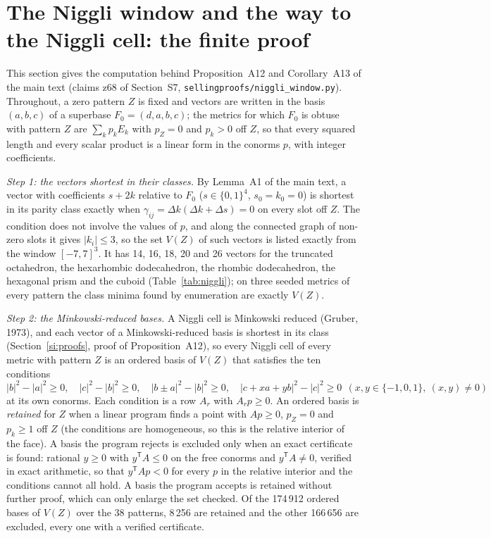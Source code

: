 \documentclass[preprint,pdf]{iucr}          %
\begin{document}
\section{The Niggli window and the way to the Niggli cell: the finite proof}\label{si:niggli}

This section gives the computation behind Proposition~A12 and Corollary~A13 of the main text (claims z68 of Section~S7, \texttt{sellingproofs/niggli\_window.py}). Throughout, a zero pattern $Z$ is fixed and vectors are written in the basis $(a,b,c)$ of a superbase $F_0=(d,a,b,c)$; the metrics for which $F_0$ is obtuse with pattern $Z$ are $\sum_kp_kE_k$ with $p_Z=0$ and $p_k>0$ off $Z$, so that every squared length and every scalar product is a linear form in the conorms $p$, with integer coefficients.

\emph{Step 1: the vectors shortest in their classes.} By Lemma~A1 of the main text, a vector with coefficients $s+2k$ relative to $F_0$ ($s\in\{0,1\}^4$, $s_0=k_0=0$) is shortest in its parity class exactly when $\gamma_{ij}=\Delta k(\Delta k+\Delta s)=0$ on every slot off $Z$. The condition does not involve the values of $p$, and along the connected graph of non-zero slots it gives $|k_i|\le3$, so the set $V(Z)$ of such vectors is listed exactly from the window $[-7,7]^3$. It has 14, 16, 18, 20 and 26 vectors for the truncated octahedron, the hexarhombic dodecahedron, the rhombic dodecahedron, the hexagonal prism and the cuboid (Table~\ref{tab:niggli}); on three seeded metrics of every pattern the class minima found by enumeration are exactly $V(Z)$.

\emph{Step 2: the Minkowski-reduced bases.} A Niggli cell is Minkowski reduced (Gruber, 1973), and each vector of a Minkowski-reduced basis is shortest in its class (Section~\ref{si:proofs}, proof of Proposition~A12), so every Niggli cell of every metric with pattern $Z$ is an ordered basis of $V(Z)$ that satisfies the ten conditions
\[
|b|^2-|a|^2\ge0,\quad |c|^2-|b|^2\ge0,\quad |b\pm a|^2-|b|^2\ge0,\quad |c+xa+yb|^2-|c|^2\ge0\ \ (x,y\in\{-1,0,1\},\ (x,y)\ne0)
\]
at its own conorms. Each condition is a row $A_r$ with $A_rp\ge0$. An ordered basis is \emph{retained} for $Z$ when a linear program finds a point with $A p\ge0$, $p_Z=0$ and $p_k\ge1$ off $Z$ (the conditions are homogeneous, so this is the relative interior of the face). A basis the program rejects is excluded only when an exact certificate is found: rational $y\ge0$ with $y^{\mathsf T}A\le0$ on the free conorms and $y^{\mathsf T}A\ne0$, verified in exact arithmetic, so that $y^{\mathsf T}Ap<0$ for every $p$ in the relative interior and the conditions cannot all hold. A basis the program accepts is retained without further proof, which can only enlarge the set checked. Of the 174\,912 ordered bases of $V(Z)$ over the 38 patterns, 8\,256 are retained and the other 166\,656 are excluded, every one with a verified certificate.
\end{document}
